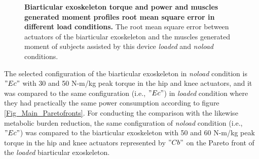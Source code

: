 \documentclass[10pt,letterpaper]{article}
\begin{document}
\begin{figure}[ht!]
	\centering
	\hfil
	\vspace{1mm}
	\caption{\small{\textbf{Biarticular exoskeleton torque and power and muscles generated moment profiles root mean square error in different load conditions.} The root mean square error between actuators of the biarticular exoskeleton and the muscles generated moment of subjects assisted by this device {\it loaded} and {\it noload} conditions.}}
	\label{Fig_Case03_RMSE}
\end{figure}
The selected configuration of the biarticular exoskeleton in {\it noload} condition is $"Ec"$ with 30 and 50 N-m/kg peak torque in the hip and knee actuators, and it was compared to the same configuration (i.e., $"Ec"$) in  {\it loaded} condition where they had practically the same power consumption according to figure \ref{Fig_Main_Paretofronts}. For conducting the comparison with the likewise metabolic burden reduction, the same configuration of {\it noload} condition (i.e., $"Ec"$) was compared to the biarticular exoskeleton with 50 and 60 N-m/kg peak torque in the hip and knee actuators represented by $"Cb"$ on the Pareto front of the {\it loaded} biarticular exoskeleton.\\
\end{document}
